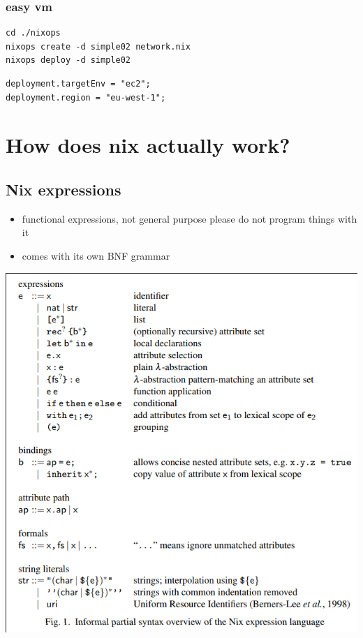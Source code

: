 \documentclass[11pt]{article}
\begin{document}
\subsubsection{easy vm}
\label{sec:orgbc432d5}
\begin{verbatim}
cd ./nixops
nixops create -d simple02 network.nix
nixops deploy -d simple02
\end{verbatim}
\begin{verbatim}
deployment.targetEnv = "ec2";
deployment.region = "eu-west-1";
\end{verbatim}
\section{How does nix actually work?}
\label{sec:org471266e}
\subsection{Nix expressions}
\label{sec:org8ad168e}
\begin{itemize}
\item functional expressions, not general purpose please do not program
things with it
\item comes with its own BNF grammar
\end{itemize}
\begin{center}
\includegraphics[width=.9\linewidth]{./images/screenshot-05.png}
\end{center}
\end{document}
